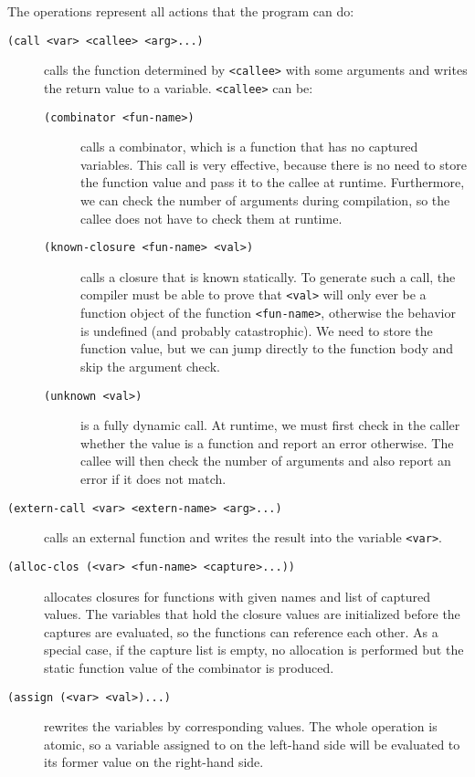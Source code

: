 The operations represent all actions that the program can do:

\begin{description}
  \item[\texttt{(call <var> <callee> <arg>...)}] calls the function determined
    by \texttt{<callee>} with some arguments and writes the return value to a
    variable. \texttt{<callee>} can be:
    \begin{description}
      \item[\texttt{(combinator <fun-name>)}] calls a combinator, which is a
        function that has no captured variables. This call is very effective,
        because there is no need to store the function value and pass it to the
        callee at runtime. Furthermore, we can check the number of arguments
        during compilation, so the callee does not have to check them at
        runtime.
      \item[\texttt{(known-closure <fun-name> <val>)}] calls a closure that is
        known statically. To generate such a call, the compiler must be able to
        prove that \texttt{<val>} will only ever be a function object of the
        function \texttt{<fun-name>}, otherwise the behavior is undefined (and
        probably catastrophic). We need to store the function value, but we can
        jump directly to the function body and skip the argument check.
      \item[\texttt{(unknown <val>)}] is a fully dynamic call. At runtime, we
        must first check in the caller whether the value is a function and
        report an error otherwise. The callee will then check the number of
        arguments and also report an error if it does not match.
    \end{description}

  \item[\texttt{(extern-call <var> <extern-name> <arg>...)}] calls an external
    function and writes the result into the variable \texttt{<var>}.

  \item[\texttt{(alloc-clos (<var> <fun-name> <capture>...))}] allocates
    closures for functions with given names and list of captured values. The
    variables that hold the closure values are initialized before the captures
    are evaluated, so the functions can reference each other. As a special case,
    if the capture list is empty, no allocation is performed but the static
    function value of the combinator is produced.

  \item[\texttt{(assign (<var> <val>)...)}] rewrites the variables by
    corresponding values. The whole operation is atomic, so a variable assigned
    to on the left-hand side will be evaluated to its former value on the
    right-hand side.
\end{description}

